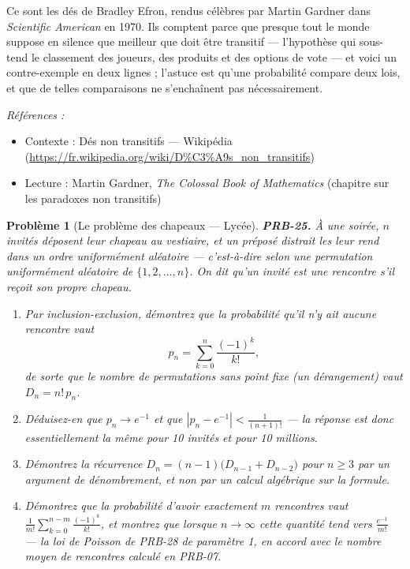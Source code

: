 \documentclass[11pt]{article}
\newtheorem{problem}{Problème}
\newenvironment{refs}{\par\small\noindent\emph{Références :}\begin{itemize}\setlength\itemsep{0pt}}{\end{itemize}\normalsize}
\begin{document}
\noindent Ce sont les dés de Bradley Efron, rendus célèbres par Martin Gardner dans
\textit{Scientific American} en 1970. Ils comptent parce que presque tout le monde suppose en
silence que \og{} meilleur que \fg{} doit être transitif --- l'hypothèse qui sous-tend le classement des
joueurs, des produits et des options de vote --- et voici un contre-exemple en deux lignes ; l'astuce
est qu'une probabilité compare deux lois, et que de telles comparaisons ne s'enchaînent pas
nécessairement.

\begin{refs}
\item Contexte : Dés non transitifs --- Wikipédia (\url{https://fr.wikipedia.org/wiki/D%C3%A9s_non_transitifs})
\item Lecture : Martin Gardner, \textit{The Colossal Book of Mathematics} (chapitre sur les paradoxes non transitifs)
\end{refs}

\bigskip

\begin{problem}[{Le problème des chapeaux --- Lycée}]
\textbf{PRB-25.} À une soirée, $ n $ invités déposent leur chapeau au vestiaire, et un
préposé distrait les leur rend dans un ordre uniformément aléatoire --- c'est-à-dire selon une
permutation uniformément aléatoire de $ \{1, 2, \dots, n\} $. On dit qu'un invité est une
\textit{rencontre} s'il reçoit son propre chapeau.
\begin{enumerate}
\item[(i)] Par inclusion-exclusion, démontrez que la probabilité qu'il n'y ait aucune rencontre vaut
\[ p_n = \sum_{k=0}^{n} \frac{(-1)^k}{k!} , \]
de sorte que le nombre de permutations sans point fixe (un \textit{dérangement}) vaut
$ D_n = n!\, p_n $.
\item[(ii)] Déduisez-en que $ p_n \to e^{-1} $ et que $ |p_n - e^{-1}| < \frac{1}{(n+1)!} $ --- la
réponse est donc essentiellement la même pour 10 invités et pour 10 millions.
\item[(iii)] Démontrez la récurrence $ D_n = (n-1)\big( D_{n-1} + D_{n-2} \big) $ pour $ n \ge 3 $ par
un argument de dénombrement, et non par un calcul algébrique sur la formule.
\item[(iv)] Démontrez que la probabilité d'avoir exactement $ m $ rencontres vaut
$ \frac{1}{m!} \sum_{k=0}^{n-m} \frac{(-1)^k}{k!} $, et montrez que lorsque $ n \to \infty $
cette quantité tend vers $ \frac{e^{-1}}{m!} $ --- la loi de Poisson de PRB-28 de paramètre 1, en
accord avec le nombre moyen de rencontres calculé en PRB-07.
\end{enumerate}

\end{problem}
\end{document}
